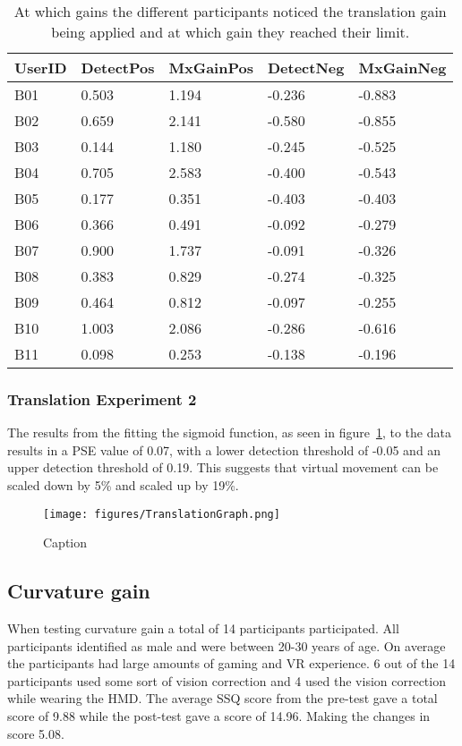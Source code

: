 \begin{table}[]
\centering
\begin{tabular}{@{}lllll@{}}
\toprule
UserID & DetectPos  & MxGainPos & DetectNeg  & MxGainNeg \\ \midrule
B01    & 0.503      & 1.194     & -0.236     & -0.883    \\
B02    & 0.659      & 2.141     & -0.580     & -0.855    \\
B03    & 0.144      & 1.180     & -0.245     & -0.525    \\
B04    & 0.705      & 2.583     & -0.400     & -0.543    \\
B05    & 0.177      & 0.351     & -0.403     & -0.403    \\
B06    & 0.366      & 0.491     & -0.092     & -0.279    \\
B07    & 0.900      & 1.737     & -0.091     & -0.326    \\
B08    & 0.383      & 0.829     & -0.274     & -0.325    \\
B09    & 0.464      & 0.812     & -0.097     & -0.255    \\
B10    & 1.003      & 2.086     & -0.286     & -0.616    \\
B11    & 0.098      & 0.253     & -0.138     & -0.196    \\ \bottomrule
\end{tabular}
\caption{At which gains the different participants noticed the translation gain being applied and at which gain they reached their limit.}
\label{tab:translation_increment}
\end{table}

\subsubsection{Translation Experiment 2 }
The results from the fitting the sigmoid function, as seen in figure~\ref{fig:translation_graph}, to the data results in a PSE value of 0.07, with a lower detection threshold of -0.05 and an upper detection threshold of 0.19. This suggests that virtual movement can be scaled down by 5\% and scaled up by 19\%.

\begin{figure}
    \centering
    \texttt{[image: figures/TranslationGraph.png]}
    \caption{Caption}
    \label{fig:translation_graph}
\end{figure}

\subsection{Curvature gain}
When testing curvature gain a total of 14 participants participated. All participants identified as male and were between 20-30 years of age. On average the participants had large amounts of gaming and VR experience. 6 out of the 14 participants used some sort of vision correction and 4 used the vision correction while wearing the HMD. The average SSQ score from the pre-test gave a total score of 9.88 while the post-test gave a score of 14.96. Making the changes in score 5.08.


